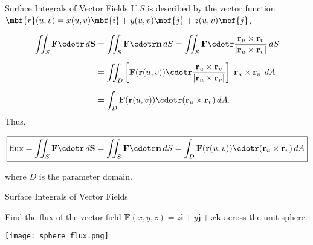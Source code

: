 \documentclass[11pt,english,
handout
]{beamer}
\begin{document}
\begin{frame}{Surface Integrals of Vector Fields}
\small
If $S$ is described by the vector function $\mbf{r}(u,v)=x(u,v)\mbf{i}+y(u,v)\mbf{j}+z(u,v)\mbf{j}$,

\begin{align*}
\iint_S \mathbf{F}\cdotr\,d\mathbf{S}&=\iint_S\mathbf{F}\cdotr\mathbf{n}\,dS=\iint_S\mathbf{F}\cdotr\frac{\mathbf{r}_u\times\mathbf{r}_v}{|\mathbf{r}_u\times\mathbf{r}_v|}\,dS\\[2mm]
&=\iint_D\left[\mathbf{F}(\mathbf{r}(u,v))\cdotr\frac{\mathbf{r}_u\times\mathbf{r}_v}{|\mathbf{r}_u\times\mathbf{r}_v|}\right]|\mathbf{r}_u\times\mathbf{r}_v|\,dA\\[2mm]
&=\int_D\mathbf{F}(\mathbf{r}(u,v))\cdotr(\mathbf{r}_u\times\mathbf{r}_v)\,dA.
\end{align*}\pause
Thus,

\[
\boxed{\text{flux}=\iint_S\mathbf{F}\cdotr\,d\mathbf{S}=\iint_S\mathbf{F}\cdotr\mathbf{n}\,dS=\int_D\mathbf{F}(\mathbf{r}(u,v))\cdotr(\mathbf{r}_u\times\mathbf{r}_v)\,dA}
\]

where $D$ is the parameter domain.
\end{frame}








\begin{frame}[t]{Surface Integrals of Vector Fields}
\small
\begin{example}
Find the flux of the vector field $\mathbf{F}(x,y,z)=z\mathbf{i}+y\mathbf{j}+x\mathbf{k}$ across the unit sphere.

\begin{center}
\texttt{[image: sphere\_flux.png]}
\end{center}
\end{example}
\end{frame}
\end{document}
